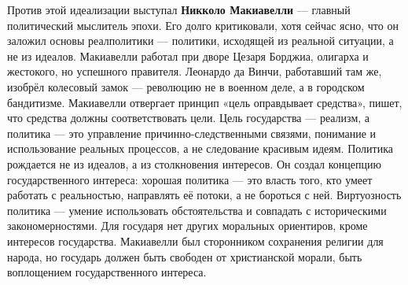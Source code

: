 Против этой идеализации выступал \textbf{Никколо Макиавелли} --- главный политический мыслитель эпохи. Его долго критиковали, хотя сейчас ясно, что он заложил основы реалполитики --- политики, исходящей из реальной ситуации, а не из идеалов. Макиавелли работал при дворе Цезаря Борджиа, олигарха и жестокого, но успешного правителя. Леонардо да Винчи, работавший там же, изобрёл колесовый замок --- революцию не в военном деле, а в городском бандитизме.
Макиавелли отвергает принцип «цель оправдывает средства», пишет, что средства должны соответствовать цели. Цель государства --- реализм, а политика --- это управление причинно-следственными связями, понимание и использование реальных процессов, а не следование красивым идеям. Политика рождается не из идеалов, а из столкновения интересов.
Он создал концепцию государственного интереса: хорошая политика --- это власть того, кто умеет работать с реальностью, направлять её потоки, а не бороться с ней. Виртуозность политика --- умение использовать обстоятельства и совпадать с историческими закономерностями. Для государя нет других моральных ориентиров, кроме интересов государства. Макиавелли был сторонником сохранения религии для народа, но государь должен быть свободен от христианской морали, быть воплощением государственного интереса.

